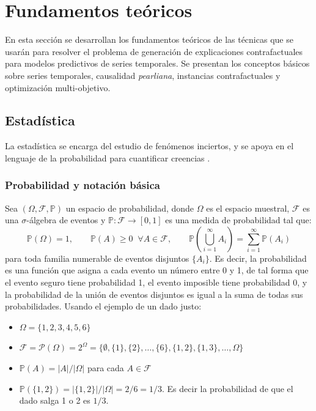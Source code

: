\documentclass[12pt]{report} %
\begin{document}
\chapter{Fundamentos teóricos}
\label{cap:fundamentos}

En esta sección se desarrollan los fundamentos teóricos de las técnicas que se usarán para resolver el problema de generación de explicaciones contrafactuales para modelos predictivos de series temporales. Se presentan los conceptos básicos sobre series temporales, causalidad \textit{pearliana}, instancias contrafactuales y optimización multi-objetivo.

\section{Estadística}

La estadística se encarga del estudio de fenómenos inciertos, y se apoya en el lenguaje de la probabilidad para cuantificar creencias \cite{Pearl2016-nx}.

\subsection{Probabilidad y notación básica}

Sea $(\Omega, \mathcal{F}, \mathbb{P})$ un espacio de probabilidad, donde $\Omega$ es el espacio muestral, $\mathcal{F}$ es una $\sigma$-álgebra de eventos y $\mathbb{P}:\mathcal{F}\to[0,1]$ es una medida de probabilidad tal que:
$$
    \mathbb{P}(\Omega)=1,
    \qquad
    \mathbb{P}(A)\geq 0\;\;\forall A\in\mathcal{F},
    \qquad
    \mathbb{P}\left(\bigcup_{i=1}^{\infty} A_i\right)=\sum_{i=1}^{\infty}\mathbb{P}(A_i)
$$
para toda familia numerable de eventos disjuntos $\{A_i\}$.
Es decir, la probabilidad es una función que asigna a cada evento un número entre 0 y 1, de tal forma que el evento seguro tiene probabilidad 1, el evento imposible tiene probabilidad 0, y la probabilidad de la unión de eventos disjuntos es igual a la suma de todas sus probabilidades.
Usando el ejemplo de un dado justo:
\begin{itemize}
    \item $\Omega=\{1,2,3,4,5,6\}$
    \item $\mathcal{F}=\mathcal{P}(\Omega)=2^{\Omega}=\{\emptyset,\{1\},\{2\},\ldots ,\{6\},\{1,2\},\{1,3\},\ldots,\Omega\}$
    \item $\mathbb{P}(A)=|A|/|\Omega|$ para cada $A\in\mathcal{F}$
    \item $\mathbb{P}(\{1,2\})=|\{1,2\}|/|\Omega|=2/6=1/3$. Es decir la probabilidad de que el dado salga 1 o 2 es $1/3$.
\end{itemize}
\end{document}
